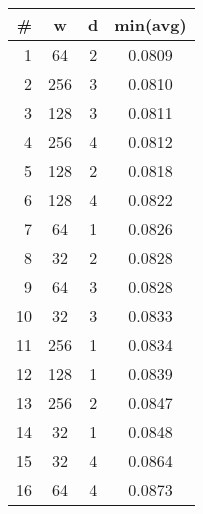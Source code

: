 \documentclass[border={15pt 1pt 5pt 1pt}, varwidth=38em]{standalone}
\begin{document}
\begin{table}[]
\centering
\begin{tabular}{r|cc|c}
\# & w   & d & min(avg) \\ \hline
1  & 64  & 2 & 0.0809   \\
2  & 256 & 3 & 0.0810   \\
3  & 128 & 3 & 0.0811   \\
4  & 256 & 4 & 0.0812   \\
5  & 128 & 2 & 0.0818   \\
6  & 128 & 4 & 0.0822   \\
7  & 64  & 1 & 0.0826   \\
8  & 32  & 2 & 0.0828   \\
9  & 64  & 3 & 0.0828   \\
10 & 32  & 3 & 0.0833   \\
11 & 256 & 1 & 0.0834   \\
12 & 128 & 1 & 0.0839   \\
13 & 256 & 2 & 0.0847   \\
14 & 32  & 1 & 0.0848   \\
15 & 32  & 4 & 0.0864   \\
16 & 64  & 4 & 0.0873  
\end{tabular}
\end{table}
\end{document}
